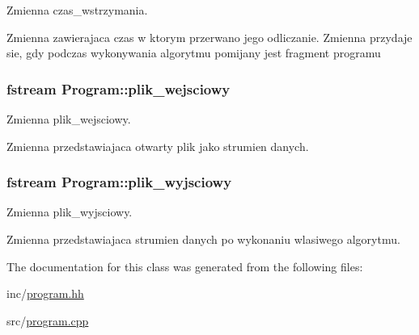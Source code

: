 Zmienna czas\+\_\+wstrzymania. 

Zmienna zawierajaca czas w ktorym przerwano jego odliczanie. Zmienna przydaje sie, gdy podczas wykonywania algorytmu pomijany jest fragment programu \hypertarget{class_program_a532ceacb1d70da66142bab96a3eb0753}{
\subsubsection[{plik\+\_\+wejsciowy}]{\setlength{\rightskip}{0pt plus 5cm}fstream Program\+::plik\+\_\+wejsciowy}}\label{class_program_a532ceacb1d70da66142bab96a3eb0753}


Zmienna plik\+\_\+wejsciowy. 

Zmienna przedstawiajaca otwarty plik jako strumien danych. \hypertarget{class_program_aaa305591a4333d799c8d353f3072d8e0}{
\subsubsection[{plik\+\_\+wyjsciowy}]{\setlength{\rightskip}{0pt plus 5cm}fstream Program\+::plik\+\_\+wyjsciowy}}\label{class_program_aaa305591a4333d799c8d353f3072d8e0}


Zmienna plik\+\_\+wyjsciowy. 

Zmienna przedstawiajaca strumien danych po wykonaniu wlasiwego algorytmu. 

The documentation for this class was generated from the following files\+:\begin{DoxyCompactItemize}
\item 
inc/\hyperlink{program_8hh}{program.\+hh}\item 
src/\hyperlink{program_8cpp}{program.\+cpp}\end{DoxyCompactItemize}
